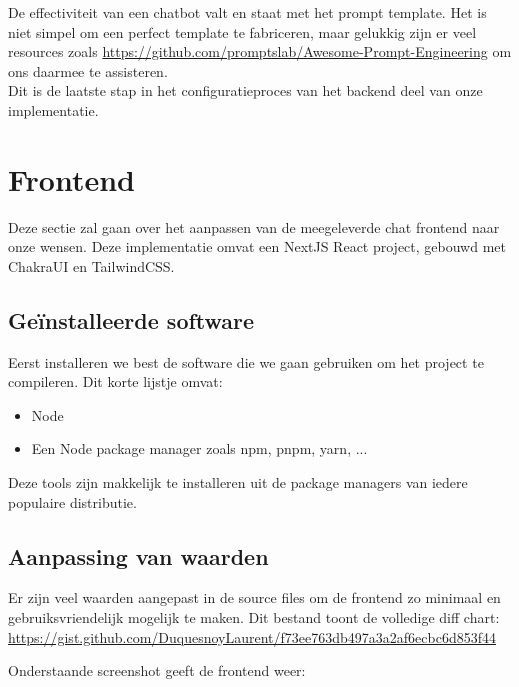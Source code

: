 De effectiviteit van een chatbot valt en staat met het prompt template.
Het is niet simpel om een perfect template te fabriceren, maar gelukkig zijn er veel resources zoals \url{https://github.com/promptslab/Awesome-Prompt-Engineering}
om ons daarmee te assisteren. \\

Dit is de laatste stap in het configuratieproces van het backend deel van onze implementatie.

\newpage
\section{Frontend}
Deze sectie zal gaan over het aanpassen van de meegeleverde chat frontend naar onze wensen.
Deze implementatie omvat een NextJS React project, gebouwd met ChakraUI en TailwindCSS.

\subsection{Geïnstalleerde software}
Eerst installeren we best de software die we gaan gebruiken om het project te compileren.
Dit korte lijstje omvat:

\begin{itemize}
	\item Node
	\item Een Node package manager zoals npm, pnpm, yarn, ...
\end{itemize}

Deze tools zijn makkelijk te installeren uit de package managers van iedere populaire distributie.

\subsection{Aanpassing van waarden}
Er zijn veel waarden aangepast in de source files om de frontend zo minimaal en gebruiksvriendelijk mogelijk te maken.
Dit bestand toont de volledige diff chart: \url{https://gist.github.com/DuquesnoyLaurent/f73ee763db497a3a2af6ecbc6d853f44}

Onderstaande screenshot geeft de frontend weer:
\begin{figure}[h]
\end{figure}
